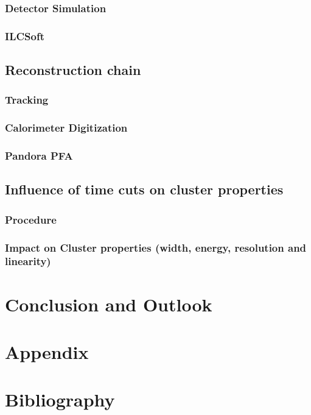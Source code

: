 \documentclass[a4paper,12pt]{report}
\begin{document}
\subsection{Detector Simulation}
\subsection{ILCSoft}
\section{Reconstruction chain}
\subsection{Tracking}
\subsection{Calorimeter Digitization}
\subsection{Pandora PFA}
\section{Influence of time cuts on cluster properties}
\subsection{Procedure}
\subsection{Impact on Cluster properties (width, energy, resolution and linearity)}

\newpage

\chapter{Conclusion and Outlook}

\newpage

\chapter{Appendix}

\newpage

\chapter{Bibliography}
\end{document}

